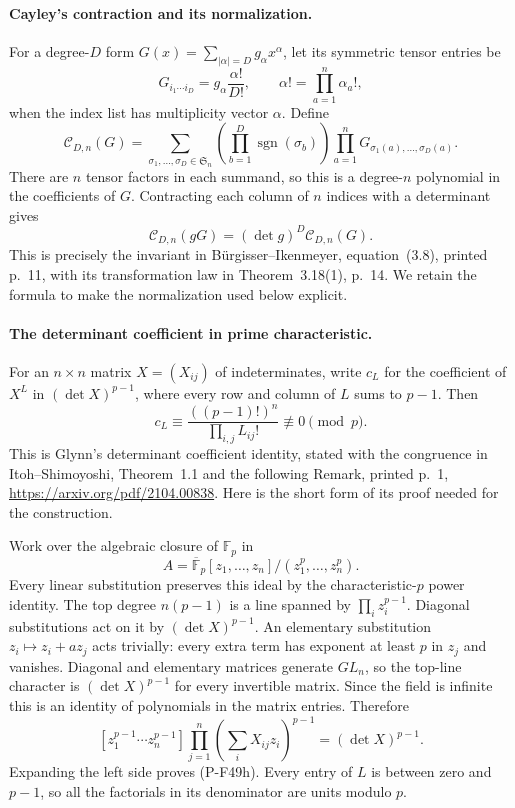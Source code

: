 \paragraph{Cayley's contraction and its normalization.}
For a degree-$D$ form
$G(x)=\sum_{|\alpha|=D}g_\alpha x^\alpha$, let its
symmetric tensor entries be
\[
       G_{i_1\cdots i_D}=g_\alpha\frac{\alpha!}{D!},
       \qquad \alpha!=\prod_{a=1}^n\alpha_a!,
                                                        \tag{P-F49e}
\]
when the index list has multiplicity vector $\alpha$.
Define
\[
 \mathcal C_{D,n}(G)=
 \sum_{\sigma_1,\ldots,\sigma_D\in\mathfrak S_n}
 \left(\prod_{b=1}^D\operatorname{sgn}(\sigma_b)\right)
 \prod_{a=1}^n G_{\sigma_1(a),\ldots,\sigma_D(a)}.
                                                        \tag{P-F49f}
\]
There are $n$ tensor factors in each summand, so this
is a degree-$n$ polynomial in the coefficients of $G$.
Contracting each column of $n$ indices with a determinant
gives
\[
             \mathcal C_{D,n}(gG)
                          =(\det g)^D\mathcal C_{D,n}(G).
                                                        \tag{P-F49g}
\]
This is precisely the invariant in B\"urgisser--Ikenmeyer,
equation~(3.8), printed p.~11, with its transformation
law in Theorem~3.18(1), p.~14. We retain the formula to
make the normalization used below explicit.

\paragraph{The determinant coefficient in prime characteristic.}
For an $n\times n$ matrix $X=(X_{ij})$ of indeterminates,
write $c_L$ for the coefficient of $X^L$ in
$(\det X)^{p-1}$, where every row and column of $L$ sums
to $p-1$. Then
\[
       c_L\equiv\frac{((p-1)!)^n}{\prod_{i,j}L_{ij}!}
                                 \not\equiv0\pmod p.  \tag{P-F49h}
\]
This is Glynn's determinant coefficient identity, stated
with the congruence in Itoh--Shimoyoshi,
Theorem~1.1 and the following Remark, printed p.~1,
\url{https://arxiv.org/pdf/2104.00838}.
Here is the short form of its proof needed for the construction.

Work over the algebraic closure of $\mathbb F_p$ in
\[
        A=\overline{\mathbb F}_p[z_1,\ldots,z_n]
                                      /(z_1^p,\ldots,z_n^p).
\]
Every linear substitution preserves this ideal by
the characteristic-$p$ power identity. The top degree
$n(p-1)$ is a line spanned by $\prod_i z_i^{p-1}$.
Diagonal substitutions act on it by $(\det X)^{p-1}$.
An elementary substitution $z_i\mapsto z_i+a z_j$
acts trivially: every extra term has exponent at least
$p$ in $z_j$ and vanishes. Diagonal and elementary
matrices generate $GL_n$, so the top-line character is
$(\det X)^{p-1}$ for every invertible matrix. Since the
field is infinite this is an identity of polynomials
in the matrix entries. Therefore
\[
 [z_1^{p-1}\cdots z_n^{p-1}]
     \prod_{j=1}^n\left(\sum_i X_{ij}z_i\right)^{p-1}
                          =(\det X)^{p-1}.             \tag{P-F49i}
\]
Expanding the left side proves (P-F49h). Every entry
of $L$ is between zero and $p-1$, so all the factorials
in its denominator are units modulo $p$.

